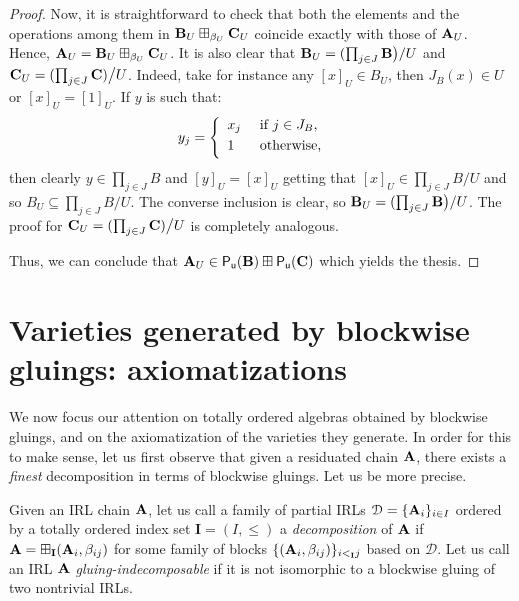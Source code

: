 \documentclass{amsart}
\theoremstyle{definition}
\numberwithin{equation}{section}
\newcommand{\alg}[1]{{\textbf{\upshape #1}}}  %
\newcommand{\vv}[1]{\mathsf {#1}}
\newcommand{\II}{{\mathbf I}} %
\newcommand{\cc}[1]{\mathcal{#1}}
\newcommand{\betaij}{\beta_{ij}}
\begin{document}
\begin{proof}
Now, it is straightforward to check that both the elements and the operations among them in $\alg B_U \boxplus_{\beta_U} \alg C_U$ coincide exactly with those of $\alg A_U$. Hence, $\alg A_U=\alg B_U \boxplus_{\beta_U} \alg C_U$. 
	It is also clear that 	$\alg B_U = (\prod _{j \in J} \alg B \big )/ U$ and $\alg C_U= (\prod_{j \in J} \alg C )\big / U$. Indeed, take for instance any $[x]_U \in B_U$, then $J_B(x) \in U$ or $[x]_U=[1]_U$. If $y$ is such that: 
	\begin{align*}
	y_j &=\left\{\begin{array}{ll}
x_j &\mbox{ if } j \in J_B, \vspace{0.1cm}\\
1 &\mbox{ otherwise,} \vspace{0.1cm}
\end{array}\right.
\end{align*}
then clearly $y \in \prod_{j \in J} B$ and $[y]_U=[x]_U$ getting that $[x]_U \in \prod_{j \in J} B/U$ and so $B_U \subseteq \prod_{j \in J} B / U$. The converse inclusion is clear, so $\alg B_U = (\prod _{j \in J} \alg B \big )/ U$. The proof for $\alg C_U= (\prod_{j \in J} \alg C )\big / U$ is completely analogous.

Thus, we can conclude that $\alg A_U \in \vv{P_u}(\alg B)\boxplus \vv{P_u}(\alg C)$ which yields the thesis. 
\end{proof}

\section{Varieties generated by blockwise gluings: axiomatizations}
We now focus our attention on totally ordered algebras obtained by blockwise gluings, and on the axiomatization of the varieties they generate. 
In order for this to make sense, let us first observe that given a residuated chain $\alg A$, there exists a {\em finest} decomposition in terms of blockwise gluings. Let us be more precise.

Given an IRL chain $\alg A$, let us call a family of partial IRLs $\cc D = \{\alg A_{i}\}_{i \in I}$ ordered by a totally ordered index set $\II = (I, \leq)$ a {\em decomposition} of $\alg A$ if $\alg A = \boxplus_{\II}(\alg A_{i}, \betaij)$ for some family of blocks $\{(\alg A_{i}, \betaij)\}_{i <_{\II} j}$ based on $\cc D$.
Let us call an IRL $\alg A$ {\em gluing-indecomposable} if it is not isomorphic to a blockwise gluing of two nontrivial IRLs.
\end{document}
